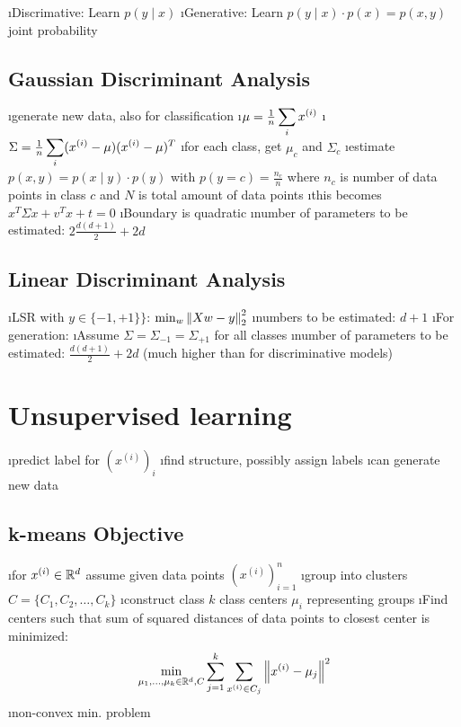 \bi
\i Discrimative: Learn $p(y \mid x)$
\i Generative: Learn $p(y \mid x) \cdot p(x) = p(x, y)$ joint probability
\ei

\subsection{Gaussian Discriminant Analysis}

\bi
\i generate new data, also for classification
\i $\mu = \frac{1}{n} \displaystyle\sum_i x^{(i)}$
\i $\Sigma = \frac{1}{n} \displaystyle\sum_i (x^{(i)} - \mu) (x^{(i)} - \mu)^T$
\i for each class, get $\mu_c$ and $\Sigma_c$
\i estimate $p(x,y) = p(x \mid y) \cdot p(y)$ with $p(y=c) = \frac{n_c}{n}$ where $n_c$ is number of data points in class $c$ and $N$ is total amount of data points
\i this becomes $x^T \Sigma x + v^Tx + t=0$
\i Boundary is quadratic
\i number of parameters to be estimated: $2 \frac{d(d+1)}{2} + 2d$
\ei

\subsection{Linear Discriminant Analysis}

\bi
\i LSR with $y \in \{-1, +1\}\}$: $\min_w \left\lVert Xw-y\right\rVert_2^2$
\i numbers to be estimated: $d+1$
\i For generation:
\bi
\i Assume $\Sigma = \Sigma_{-1} = \Sigma_{+1}$ for all classes
\i number of parameters to be estimated: $\frac{d(d+1)}{2} + 2d$ (much higher than for discriminative models)
\ei
\ei

\section{Unsupervised learning}

\bi
\i predict label for $(x^{(i)})_i$
\i find structure, possibly assign labels
\i can generate new data
\ei

\subsection{k-means Objective}

\bi
\i for $x^{(i)} \in \mathbb{R}^d$ assume given data points $(x^{(i)})^n_{i=1}$
\i group into clusters $C = \{C_1, C_2, \ldots, C_k\}$
\i construct class $k$ class centers $\mu_i$ representing groups
\i Find centers such that sum of squared distances of data points to closest center is minimized: \[
\min_{\mu_1, \ldots, \mu_k \in \mathbb{R}^d, C} \displaystyle\sum_{j=1}^k \displaystyle\sum_{x^{(i)} \in C_j} \left\lVert x^{(i)} - \mu_j\right\rVert^2
\]
\i non-convex min. problem
\ei


